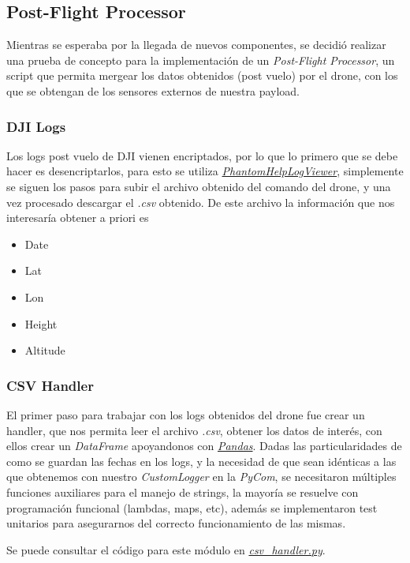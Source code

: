 \documentclass[12pt]{article}
\begin{document}
\subsection{Post-Flight Processor}
Mientras se esperaba por la llegada de nuevos componentes, se decidió realizar una prueba de concepto para la implementación de un \textit{Post-Flight Processor}, un script que permita mergear los datos obtenidos (post vuelo) por el drone, con los que se obtengan de los sensores externos de nuestra payload.

\subsubsection{DJI Logs}
Los logs post vuelo de DJI vienen encriptados, por lo que lo primero que se debe hacer es desencriptarlos, para esto se utiliza \href{https://www.phantomhelp.com/logviewer/upload/}{\textit{PhantomHelpLogViewer}}, simplemente se siguen los pasos para subir el archivo obtenido del comando del drone, y una vez procesado descargar el \textit{.csv} obtenido.
De este archivo la información que nos interesaría obtener a priori es 
\begin{itemize}
  \item Date
  \item Lat
  \item Lon
  \item Height
  \item Altitude
\end{itemize}

\subsubsection{CSV Handler}
El primer paso para trabajar con los logs obtenidos del drone fue crear un handler, que nos permita leer el archivo \textit{.csv}, obtener los datos de interés, con ellos crear un \textit{DataFrame} apoyandonos con \href{https://pandas.pydata.org/}{\textit{Pandas}}.
Dadas las particularidades de como se guardan las fechas en los logs, y la necesidad de que sean idénticas a las que obtenemos con nuestro \textit{CustomLogger} en la \textit{PyCom}, se necesitaron múltiples funciones auxiliares para el manejo de strings, la mayoría se resuelve con programación funcional (lambdas, maps, etc), además se implementaron test unitarios para asegurarnos del correcto funcionamiento de las mismas.

Se puede consultar el código para este módulo en \href{https://github.com/sofia-am/DJI\_Payload\_Development/blob/main/log/post\_flight\_logger\_processor/src/csv\_handler.py}{\textit{csv\_handler.py}}.
\end{document}
